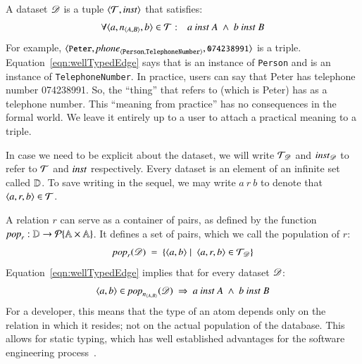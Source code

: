 \documentclass{elsarticle}
\begin{document}
   A dataset $\mathscr{D}$ is a tuple $\langle{\mathcal{T}},{\text{\it inst\/}}\rangle$ that satisfies:
\begin{eqnarray}
   \forall\triple{a}{\declare{n}{A}{B}}{b}\in\triples&:&a\ \inst\ A\ \wedge\ b\ \inst\ B
   \label{eqn:wellTypedEdge}
\end{eqnarray}
   For example, $\langle{\text{{\tt\small Peter}}},{\text{\it \text{\it phone\/}\/}_{\langle{\tt Person},{\tt TelephoneNumber}\rangle}},{\text{{\tt\small 074238991}}}\rangle$ is a triple.
   Equation~\ref{eqn:wellTypedEdge} says that  is an instance of {\tt Person} and  is an instance of {\tt TelephoneNumber}.
   In practice, users can say that Peter has telephone number 074238991.
   So, the ``thing'' that  refers to (which is Peter) has  as a telephone number.
   This ``meaning from practice'' has no consequences in the formal world.
   We leave it entirely up to a user to attach a practical meaning to a triple.

   In case we need to be explicit about the dataset,
   we will write $\mathcal{T}_{\mathscr{D}}$ and $\text{\it inst\/}_{\mathscr{D}}$ to refer to $\mathcal{T}$ and $\text{\it inst\/}$ respectively.
   Every dataset is an element of an infinite set called $\mathbb{D}$.
   To save writing in the sequel, we may write $a\ r\ b$ to denote that $\langle{a},{r},{b}\rangle\in\mathcal{T}$.

   A relation $r$ can serve as a container of pairs,
   as defined by the function $\text{\it pop\/}_r:\mathbb{D}\rightarrow\cal{P}\{\mathbb{A}\times\mathbb{A}\}$.
   It defines a set of pairs, which we call the population of $r$:
\begin{equation}
   \pop{r}{\dataset}\ =\ \{ \pair{a}{b}\mid\ \triple{a}{r}{b}\in\triples_{\dataset}\}
\label{eqn:pop}
\end{equation}
   Equation~\ref{eqn:wellTypedEdge} implies that for every dataset $\mathscr{D}$:
\[\pair{a}{b}\in\pop{\declare{n}{A}{B}}{\dataset}\ \Rightarrow\ a\ \inst\ A\ \wedge\ b\ \inst\ B\]
   For a developer, this means that the type of an atom depends only on the relation in which it resides; not on the actual population of the database.
   This allows for static typing, which has well established advantages for the software engineering process~\cite{HanenbergKRTS14,Petersen2014}.
\end{document}
